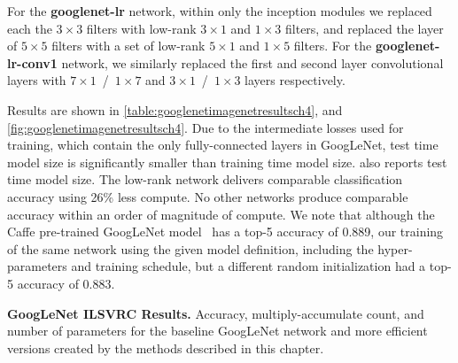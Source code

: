 \documentclass[thesis]{subfiles}
\begin{document}
    For the \textbf{googlenet-lr} network, within only the inception modules we replaced each the $3\times 3$ filters with low-rank $3 \times 1$ and $1\times 3$ filters, and replaced the layer of $5\times 5$ filters with a set of low-rank $5 \times 1$ and $1\times 5$ filters. For the \textbf{googlenet-lr-conv1} network, we similarly replaced the first and second layer convolutional layers with $7 \times 1$~/~$1\times 7$ and $3 \times 1$~/~$1\times 3$ layers respectively.
    
    Results are shown in \cref{table:googlenetimagenetresultsch4}, and \cref{fig:googlenetimagenetresultsch4}. Due to the intermediate losses used for training, which contain the only fully-connected layers in GoogLeNet, test time model size is significantly smaller than training time model size.  also reports test time model size. The low-rank network delivers comparable classification accuracy using 26\% less compute.  No other networks produce comparable accuracy within an order of magnitude of compute. We note that although the Caffe pre-trained GoogLeNet model~\citep{Jia2014} has a top-5 accuracy of 0.889, our training of the same network using the given model definition, including the hyper-parameters and training schedule, but a different random initialization had a top-5 accuracy of 0.883.
    
    \begin{table}[tbp]
        \centering
        \caption[Low-rank GoogLeNet ILSVRC results]{{\bf GoogLeNet ILSVRC Results.} Accuracy, multiply-accumulate count, and number of parameters for the baseline GoogLeNet network and more efficient versions created by the methods described in this chapter.
        }
        \data
        \pgfplotstabletypeset[
        every head row/.style={
            before row=\toprule,after row=\midrule},
        every last row/.style={
            after row=\bottomrule},
        every first row/.style={
            after row=\bottomrule}, 
        fixed zerofill,     %
        columns={Network, Multiply-Acc., Test Param., Top-1 Acc., Top-5 Acc.},
        columns/Multiply-Acc./.style={
            column name=Multiple-Acc. {\small $\times 10^{9}$},
            preproc/expr={{##1/1e9}}
        },
        columns/Test Param./.style={
            column name=Test Param. {\small $\times 10^{6}$},
            preproc/expr={{##1/1e6}}
        },
        column type/.add={lrrrrrr}{},
        columns/Network/.style={string type},
        columns/Top-1 Acc./.style={precision=3},
        columns/Top-5 Acc./.style={precision=3},
        highlight col max ={\data}{Top-1 Acc.},
        highlight col max ={\data}{Top-5 Acc.}, 
        highlight col min ={\data}{Test Param.}, 
        highlight col min ={\data}{Multiply-Acc.}, 
        col sep=comma]{\data}
        \label{table:googlenetimagenetresultsch4}
    \end{table}
    
\end{document}
